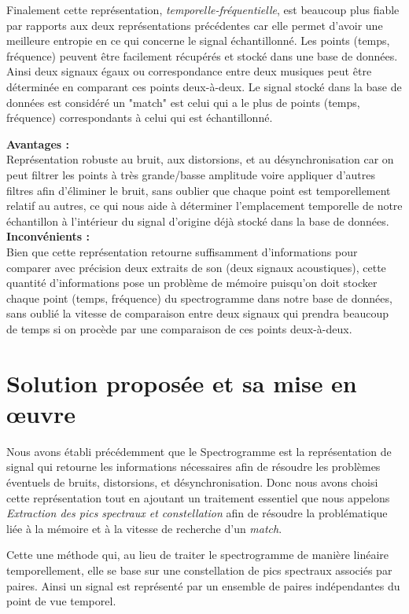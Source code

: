 \documentclass[11pt, report, french]{scrreprt}
\begin{document}
\vspace{0.5cm}
Finalement cette représentation, \textit{temporelle-fréquentielle}, est beaucoup plus fiable par rapports aux deux représentations précédentes car elle permet d'avoir une meilleure entropie en ce qui concerne le signal échantillonné. Les points (temps, fréquence) peuvent être facilement récupérés et stocké dans une base de données. Ainsi deux signaux égaux ou correspondance entre deux musiques peut être déterminée en comparant ces points deux-à-deux. Le signal stocké dans la base de données est considéré un "match" est celui qui a le plus de points (temps, fréquence) correspondants à celui qui est échantillonné.\\\par

\newpage
\textbf{Avantages :}\\

Représentation robuste au bruit, aux distorsions, et au désynchronisation car on peut filtrer les points à très grande/basse amplitude voire appliquer d'autres filtres afin d'éliminer le bruit, sans oublier que chaque point est temporellement relatif au autres, ce qui nous aide à déterminer l'emplacement temporelle de notre échantillon à l'intérieur du signal d'origine déjà stocké dans la base de données.\\

\textbf{Inconvénients :}\\

Bien que cette représentation retourne suffisamment d'informations pour comparer avec précision deux extraits de son (deux signaux acoustiques), cette quantité d'informations pose un problème de mémoire puisqu'on doit stocker chaque point (temps, fréquence) du spectrogramme dans notre base de données, sans oublié la vitesse de comparaison entre deux signaux qui prendra beaucoup de temps si on procède par une comparaison de ces points deux-à-deux.

\section{Solution proposée et sa mise en œuvre}
Nous avons établi précédemment que le Spectrogramme est la représentation de signal qui retourne les informations nécessaires afin de résoudre les problèmes éventuels de bruits, distorsions, et désynchronisation. Donc nous avons choisi cette représentation tout en ajoutant un traitement essentiel que nous appelons \textit{Extraction des pics spectraux et constellation} afin de résoudre la problématique liée à la mémoire et à la vitesse de recherche d'un \textit{match}.\\\par
Cette une méthode qui, au lieu de traiter le spectrogramme de manière linéaire temporellement, elle se base sur une constellation de pics spectraux associés par paires. Ainsi un signal est représenté par un ensemble de paires indépendantes du point de vue temporel.\\
\end{document}

